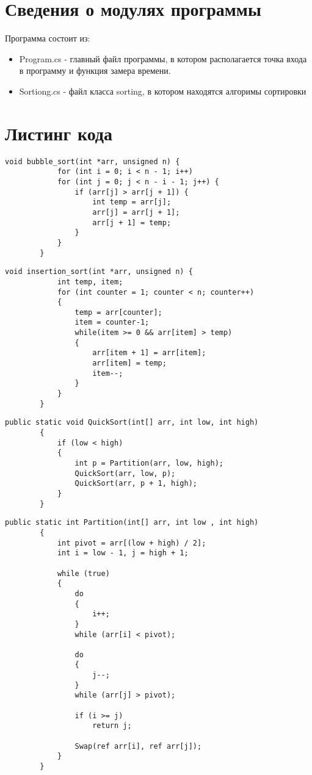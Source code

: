\documentclass[12pt]{report}
\begin{document}
\section{Сведения о модулях программы}
Программа состоит из:
\begin{itemize}
	\item Program.cs - главный файл программы, в котором располагается точка входа в программу и функция замера времени.
	\item Sortiong.cs - файл класса sorting, в котором находятся алгоримы сортировки
\end{itemize}

\section{Листинг кода}
\begin{lstlisting}[label=bubble,caption=Алгоритм сортировки пузырьком]
        void bubble_sort(int *arr, unsigned n) {
        	for (int i = 0; i < n - 1; i++)
        	for (int j = 0; j < n - i - 1; j++) {
        		if (arr[j] > arr[j + 1]) {
        			int temp = arr[j];
        			arr[j] = arr[j + 1];
        			arr[j + 1] = temp;
        		}
        	}
        }
\end{lstlisting}
\newpage
\begin{lstlisting}[label=insertion,caption=Алгоритм сортировки вставками]
        void insertion_sort(int *arr, unsigned n) {
        	int temp, item;
        	for (int counter = 1; counter < n; counter++)
        	{
        		temp = arr[counter];
        		item = counter-1;
        		while(item >= 0 && arr[item] > temp)
        		{
        			arr[item + 1] = arr[item];
        			arr[item] = temp;
        			item--;
        		}
        	}
        }
\end{lstlisting}

\begin{lstlisting}[label=quick,caption=Алгоритм быстрой сортировки]
        public static void QuickSort(int[] arr, int low, int high)
        {
            if (low < high)
            {
                int p = Partition(arr, low, high);
                QuickSort(arr, low, p);
                QuickSort(arr, p + 1, high);
            }
        }
\end{lstlisting}

\begin{lstlisting}[label=pivot,caption=Алгоритм поиска опорного элемента]
       public static int Partition(int[] arr, int low , int high)
        {
            int pivot = arr[(low + high) / 2];
            int i = low - 1, j = high + 1;

            while (true)
            {
                do
                {
                    i++;
                }
                while (arr[i] < pivot);

                do
                {
                    j--;
                }
                while (arr[j] > pivot);

                if (i >= j)
                    return j;

                Swap(ref arr[i], ref arr[j]);
            }
        }
\end{lstlisting}
\end{document}
